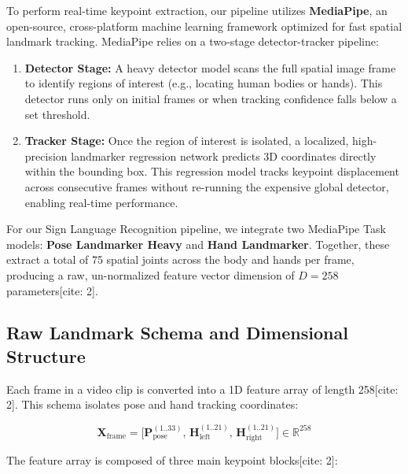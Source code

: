 \documentclass[12pt,a4paper]{article}
\begin{document}
To perform real-time keypoint extraction, our pipeline utilizes \textbf{MediaPipe}, an open-source, cross-platform machine learning framework optimized for fast spatial landmark tracking. MediaPipe relies on a two-stage detector-tracker pipeline:
\begin{enumerate}
    \item \textbf{Detector Stage:} A heavy detector model scans the full spatial image frame to identify regions of interest (e.g., locating human bodies or hands). This detector runs only on initial frames or when tracking confidence falls below a set threshold.
    \item \textbf{Tracker Stage:} Once the region of interest is isolated, a localized, high-precision landmarker regression network predicts 3D coordinates directly within the bounding box. This regression model tracks keypoint displacement across consecutive frames without re-running the expensive global detector, enabling real-time performance.
\end{enumerate}

For our Sign Language Recognition pipeline, we integrate two MediaPipe Task models: \textbf{Pose Landmarker Heavy} and \textbf{Hand Landmarker}. Together, these extract a total of 75 spatial joints across the body and hands per frame, producing a raw, un-normalized feature vector dimension of $D = 258$ parameters[cite: 2].

\subsection{Raw Landmark Schema and Dimensional Structure}

Each frame in a video clip is converted into a 1D feature array of length 258[cite: 2]. This schema isolates pose and hand tracking coordinates:

\begin{equation}
\mathbf{X}_{\text{frame}} = \Big[ \mathbf{P}_{\text{pose}}^{(1..33)}, \, \mathbf{H}_{\text{left}}^{(1..21)}, \, \mathbf{H}_{\text{right}}^{(1..21)} \Big] \in \mathbb{R}^{258}
\end{equation}

The feature array is composed of three main keypoint blocks[cite: 2]:
\end{document}
